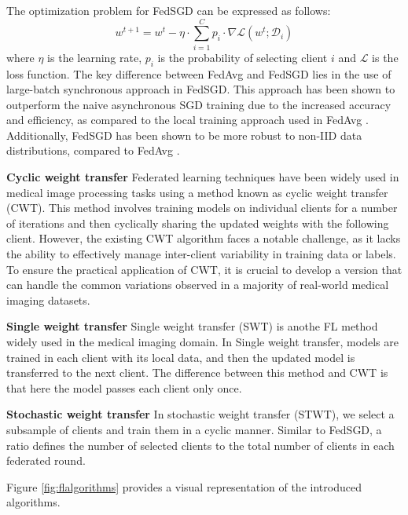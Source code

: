 The optimization problem for FedSGD can be expressed as follows:
\begin{equation}
w^{t+1} = w^{t} - \eta \cdot \sum\limits_{i=1}^{C}p_i \cdot \nabla \mathcal{L} (w^t;\mathcal{D}_i)
\end{equation}
where $\eta$ is the learning rate, $p_i$ is the probability of selecting client $i$ and $\mathcal{L}$ is the loss function.
The key difference between FedAvg and FedSGD lies in the use of large-batch synchronous approach in FedSGD. This approach has been shown to outperform the naive asynchronous SGD training due to the increased accuracy and efficiency, as compared to the local training approach used in FedAvg \cite{chai2020fedeval}\cite{charles2021large}. Additionally, FedSGD has been shown to be more robust to non-IID data distributions, compared to FedAvg \cite{chai2020fedeval}. 

\textbf{Cyclic weight transfer} Federated learning techniques have been widely used in medical image processing tasks using a method known as cyclic weight transfer (CWT)\cite{balachandar2020accounting}. This method involves training models on individual clients for a number of iterations and then cyclically sharing the updated weights with the following client. However, the existing CWT algorithm faces a notable challenge, as it lacks the ability to effectively manage inter-client variability in training data or labels.  To ensure the practical application of CWT, it is crucial to develop a version that can handle the common variations observed in a majority of real-world medical imaging datasets\cite{darzidehkalanifederatedII}.

\textbf{Single weight transfer} Single weight transfer (SWT) is anothe FL method widely used in the medical imaging domain. In Single weight transfer, models are trained in each client with its local data, and then the updated model is transferred to the next client. The difference between this method and CWT is that here the model passes each client only once\cite{darzidehkalanifederatedI}. 

\textbf{Stochastic weight transfer}
In stochastic weight transfer (STWT), we select a subsample of clients and train them in a cyclic manner. Similar to FedSGD, a ratio defines the number of selected clients to the total number of clients in each federated round. 

Figure \ref{fig:flalgorithms} provides a visual representation of the introduced algorithms.



